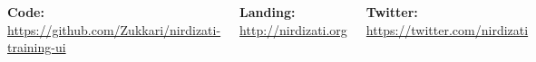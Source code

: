 \documentclass[24pt, a0paper, landscape]{tikzposter}
\begin{document}
\begin{columns}
{        \bigbreak
        \textbf{Code:} \href{https://github.com/Zukkari/nirdizati-training-ui}{\url{https://github.com/Zukkari/nirdizati-training-ui}}
        
        \bigbreak
        \textbf{Landing:} \href{http://nirdizati.org/}{\url{http://nirdizati.org}}
        
        \bigbreak

        \textbf{Twitter:} \href{https://twitter.com/nirdizati}{\url{https://twitter.com/nirdizati}}
        }

        \block{}
        {

        \begin{multicols}{2}
            \begin{tikzfigure}
                \includegraphics[scale=0.9]{figures/unilogo.jpg}
            \end{tikzfigure}

            \columnbreak

            \begin{tikzfigure}
                \includegraphics[scale=0.5]{figures/qr.png}
            \end{tikzfigure}
        \end{multicols}

        }

    \end{columns}
\end{document}

